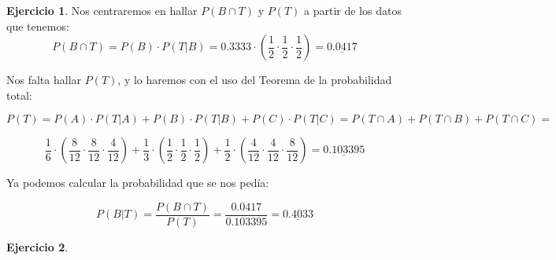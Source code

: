 \documentclass[a4paper, 12pt]{article}
\theoremstyle{definition}
\newtheorem{ej}{Ejercicio}
\begin{document}
\begin{ej}
Nos centraremos en hallar $P(B \cap T)$ y $P(T)$ a partir de los datos que tenemos:
\[
    P(B \cap T) = P(B) \cdot P(T|B) = 0.3333 \cdot \left(\frac{1}{2} \cdot \dfrac{1}{2} \cdot \frac{1}{2} \right) = \underline{0.0417} 
\]

Nos falta hallar $P(T)$, y lo haremos con el uso del Teorema de la probabilidad total:

\begin{center}
    $P(T) = P(A) \cdot P(T|A) + P(B) \cdot P(T|B) + P(C) \cdot P(T|C) = P(T \cap A) + P(T \cap B) + P(T \cap C) = $
\end{center}

\[
    \frac{1}{6}\cdot \left(\frac{8}{12} \cdot \dfrac{8}{12} \cdot \frac{4}{12} \right) + \frac{1}{3} \cdot \left(\frac{1}{2} \cdot \dfrac{1}{2} \cdot \frac{1}{2} \right) + \frac{1}{2} \cdot \left(\frac{4}{12} \cdot \dfrac{4}{12} \cdot \frac{8}{12} \right) = \underline{0.103395}
\]

Ya podemos calcular la probabilidad que se nos pedía:

\[
    P(B|T) = \frac{P(B \cap T)}{P(T)} = \frac{0.0417}{0.103395} = \underline{0.4033}
\]
\end{ej}

\begin{ej}
\end{ej}
\end{document}
